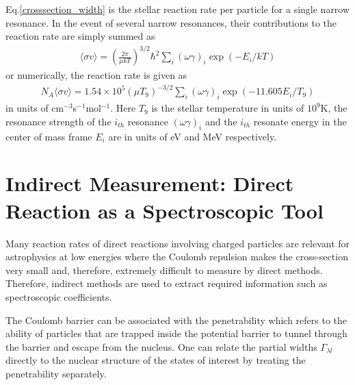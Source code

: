 Eq.\ref{crosssection_width} is the stellar reaction rate per particle for a single narrow resonance. In the event of several narrow resonances, their contributions to the reaction rate are simply summed as
\begin{equation}
    \label{crosssection_sum}
    \begin{aligned}
        \langle \sigma v \rangle = (\frac{2 \pi}{\mu k T})^{3/2} \hbar^2 \sum_i(\omega \gamma)_i \exp(-E_i/kT)
    \end{aligned}
\end{equation}
or numerically, the reaction rate is given as
\begin{equation}
    \begin{aligned}
        N_A\langle \sigma v \rangle = 1.54\times10^5(\mu T_9)^{-3/2} \sum_i(\omega \gamma)_i \exp(-11.605E_i/T_9)
    \end{aligned}
\end{equation}
in units of cm$^{-3}$s$^{-1}$mol$^{-1}$. Here $T_9$ is the stellar temperature in units of $10^9$K, the resonance strength of the $i_{th}$ resonance $(\omega \gamma)_i$ and the $i_{th}$ resonate energy in the center of mass frame $E_i$ are in units of eV and MeV respectively.


\section{Indirect Measurement: Direct Reaction as a Spectroscopic Tool}

Many reaction rates of direct reactions involving charged particles are relevant for astrophysics at low energies where the Coulomb repulsion makes the cross-section very small and, therefore, extremely difficult to measure by  direct methods. Therefore, indirect methods are used to extract required information such as spectroscopic coefficients.

The Coulomb barrier can be associated with the penetrability which refers to the ability of particles that are trapped inside the potential barrier to tunnel through the barrier and escape from the nucleus. One can relate the partial widths  $\Gamma_{\lambda l}$ directly to the nuclear structure of the states of interest by treating the penetrability separately.

